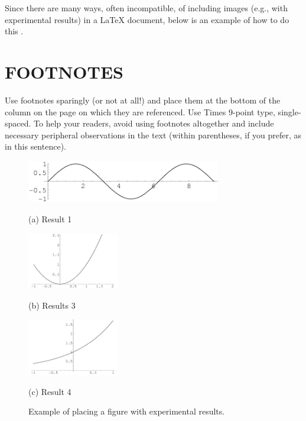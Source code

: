 \documentclass{article}
\begin{document}
Since there are many ways, often incompatible, of including images (e.g., with
experimental results) in a LaTeX document, below is an example of how to do
this \cite{Lamp86}.

\section{FOOTNOTES}
\label{sec:foot}

Use footnotes sparingly (or not at all!) and place them at the bottom of the
column on the page on which they are referenced. Use Times 9-point type,
single-spaced. To help your readers, avoid using footnotes altogether and
include necessary peripheral observations in the text (within parentheses, if
you prefer, as in this sentence).

\begin{figure}[htb]

\begin{minipage}[b]{1.0\linewidth}
  \centering
  \centerline{\includegraphics[width=8.5cm]{image1.png}}
  \centerline{(a) Result 1}\medskip
\end{minipage}
%
\begin{minipage}[b]{.48\linewidth}
  \centering
  \centerline{\includegraphics[width=4.0cm]{image3.png}}
  \centerline{(b) Results 3}\medskip
\end{minipage}
\hfill
\begin{minipage}[b]{0.48\linewidth}
  \centering
  \centerline{\includegraphics[width=4.0cm]{image4.png}}
  \centerline{(c) Result 4}\medskip
\end{minipage}
%
\caption{Example of placing a figure with experimental results.}
\label{fig:res}
%
\end{figure}
\end{document}

